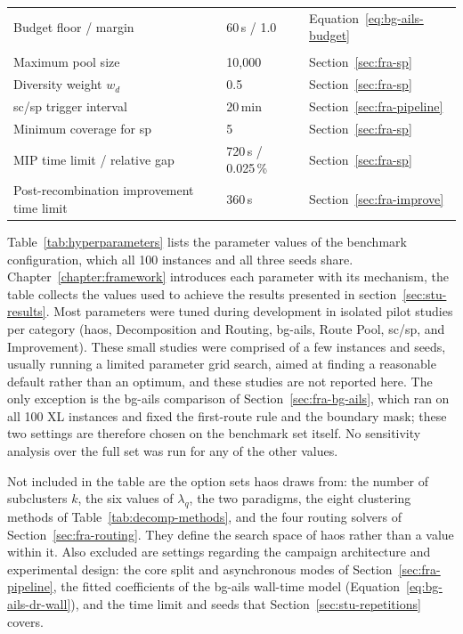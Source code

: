 \begin{table}[!htb]
\begin{tabularx}{\linewidth}{@{}
  >{\raggedright\arraybackslash}X
  l
  w{l}{\hypdefinedcol}
@{}}
Budget floor / margin & 60\,s / 1.0 & Equation~\ref{eq:bg-ails-budget} \\
\addlinespace
{} \\
Maximum pool size & 10{,}000 & Section~\ref{sec:fra-sp} \\
Diversity weight $w_d$ & 0.5 & Section~\ref{sec:fra-sp} \\
\gls{sc}/\gls{sp} trigger interval & 20\,min & Section~\ref{sec:fra-pipeline} \\
Minimum coverage for \gls{sp} & 5 & Section~\ref{sec:fra-sp} \\
MIP time limit / relative gap & 720\,s / 0.025\,\% & Section~\ref{sec:fra-sp} \\
Post-recombination improvement time limit & 360\,s & Section~\ref{sec:fra-improve} \\
\bottomrule
\end{tabularx}
\end{table}
Table~\ref{tab:hyperparameters} lists the parameter values of the benchmark
configuration, which all 100 instances and all three seeds share.
Chapter~\ref{chapter:framework} introduces each parameter with its mechanism, the
table collects the values used to achieve the results presented in section~\ref{sec:stu-results}.
Most parameters were tuned during development in isolated pilot studies per category (\gls{haos}, Decomposition and Routing, \gls{bg-ails}, Route Pool, \gls{sc}/\gls{sp}, and Improvement). These small studies were comprised of a few instances and seeds, usually running a limited parameter grid search, aimed at finding a reasonable default rather than an optimum, and these studies are not reported here. The only exception is the \gls{bg-ails} comparison of Section~\ref{sec:fra-bg-ails}, which ran on all 100 XL
instances and fixed the first-route rule and the boundary mask; these two
settings are therefore chosen on the benchmark set itself. No sensitivity
analysis over the full set was run for any of the other values.

Not included in the table are the option sets \gls{haos} draws from: the number of subclusters $k$, the six values of $\lambda_q$, the two paradigms, the eight clustering methods of Table~\ref{tab:decomp-methods}, and the four
routing solvers of Section~\ref{sec:fra-routing}. They define the search space of
\gls{haos} rather than a value within it. Also excluded are settings regarding the campaign architecture and experimental design: the core split and asynchronous modes of Section~\ref{sec:fra-pipeline}, the fitted coefficients of the
\gls{bg-ails} wall-time model (Equation~\ref{eq:bg-ails-dr-wall}), and the time limit and seeds that Section~\ref{sec:stu-repetitions} covers.

